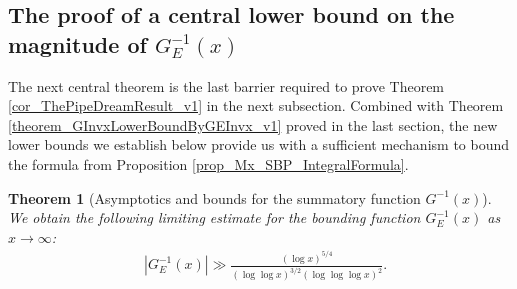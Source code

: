\documentclass[11pt,reqno,a4letter]{article}
\numberwithin{figure}{section}
\numberwithin{table}{section}
\theoremstyle{plain}
\newtheorem{theorem}{Theorem}
\numberwithin{theorem}{section}
\theoremstyle{definition}
\newcommand{\NBRef}[1]{}
\begin{document}
\subsection{The proof of a central lower bound on the magnitude of $G_{E}^{-1}(x)$} 

The next central theorem is the last barrier required to prove 
Theorem \ref{cor_ThePipeDreamResult_v1} 
in the next subsection. 
Combined with Theorem \ref{theorem_GInvxLowerBoundByGEInvx_v1} 
proved in the last section, the new lower bounds we establish below provide us 
with a sufficient mechanism to bound the formula from 
Proposition \ref{prop_Mx_SBP_IntegralFormula}. 

\begin{theorem}[Asymptotics and bounds for the summatory function $G^{-1}(x)$] 
\label{theorem_gInv_GeneralAsymptoticsForms}
We obtain the following limiting estimate for the bounding function 
$G_{E}^{-1}(x)$ as $x \rightarrow \infty$: 
\begin{align*} 
 & \left\lvert G_{E}^{-1}\left(x\right) \right\rvert
     \gg \frac{(\log x)^{5/4}}{(\log\log x)^{3/2} (\log\log\log x)^2}. 
\end{align*} 
\end{theorem} 
\NBRef{A10-2020.04-26} 
\end{document}
